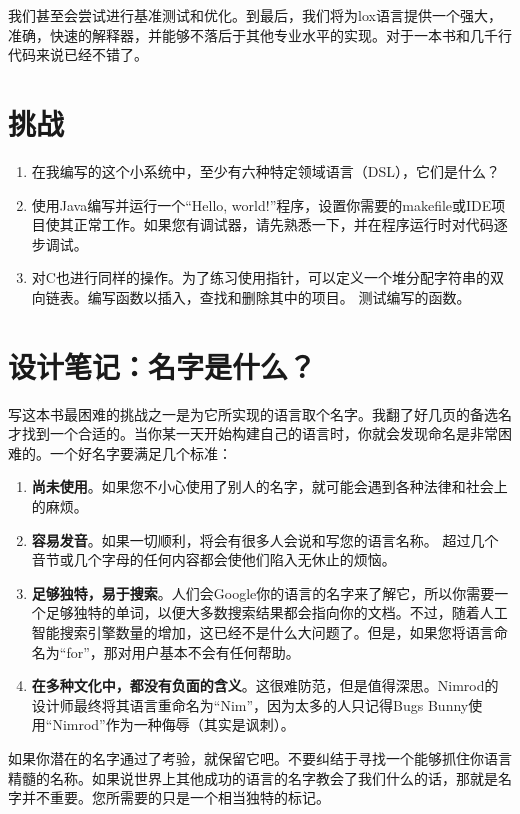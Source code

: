 \documentclass[cn,11pt,chinese]{elegantbook}
\begin{document}
我们甚至会尝试进行基准测试和优化。到最后，我们将为lox语言提供一个强大，准确，快速的解释器，并能够不落后于其他专业水平的实现。对于一本书和几千行代码来说已经不错了。

\section{挑战}

\begin{enumerate}
  \item 在我编写的这个小系统中，至少有六种特定领域语言（DSL），它们是什么？
  \item 使用Java编写并运行一个“Hello, world!”程序，设置你需要的makefile或IDE项目使其正常工作。如果您有调试器，请先熟悉一下，并在程序运行时对代码逐步调试。
  \item 对C也进行同样的操作。为了练习使用指针，可以定义一个堆分配字符串的双向链表。编写函数以插入，查找和删除其中的项目。 测试编写的函数。
\end{enumerate}

\section{设计笔记：名字是什么？}

写这本书最困难的挑战之一是为它所实现的语言取个名字。我翻了好几页的备选名才找到一个合适的。当你某一天开始构建自己的语言时，你就会发现命名是非常困难的。一个好名字要满足几个标准：

\begin{enumerate}
  \item \textbf{尚未使用}。如果您不小心使用了别人的名字，就可能会遇到各种法律和社会上的麻烦。
  \item \textbf{容易发音}。如果一切顺利，将会有很多人会说和写您的语言名称。 超过几个音节或几个字母的任何内容都会使他们陷入无休止的烦恼。
  \item \textbf{足够独特，易于搜索}。人们会Google你的语言的名字来了解它，所以你需要一个足够独特的单词，以便大多数搜索结果都会指向你的文档。不过，随着人工智能搜索引擎数量的增加，这已经不是什么大问题了。但是，如果您将语言命名为“for”，那对用户基本不会有任何帮助。
  \item \textbf{在多种文化中，都没有负面的含义}。这很难防范，但是值得深思。Nimrod的设计师最终将其语言重命名为“Nim”，因为太多的人只记得Bugs Bunny使用“Nimrod”作为一种侮辱（其实是讽刺）。
\end{enumerate}

如果你潜在的名字通过了考验，就保留它吧。不要纠结于寻找一个能够抓住你语言精髓的名称。如果说世界上其他成功的语言的名字教会了我们什么的话，那就是名字并不重要。您所需要的只是一个相当独特的标记。
\end{document}
